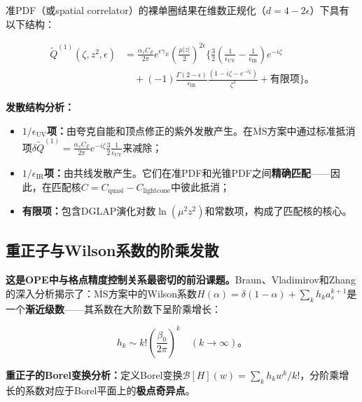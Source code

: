 \documentclass[12pt,a4paper]{ctexart}
\theoremstyle{definition}
\begin{document}
准PDF（或spatial correlator）的裸单圈结果在维数正规化（$d=4-2\epsilon$）下具有以下结构\cite{Izubuchi2018}：

\begin{equation}
\begin{aligned}
\tilde{Q}^{(1)}(\zeta, z^2, \epsilon) &= \frac{\alpha_s C_F}{2\pi} e^{\epsilon\gamma_E}\left(\frac{\mu|z|}{2}\right)^{2\epsilon} \Bigg\{ \frac{3}{2}\left(\frac{1}{\epsilon_{\text{UV}}} - \frac{1}{\epsilon_{\text{IR}}}\right) e^{-i\zeta} \\
&\quad + (-1)\frac{\Gamma(2-\epsilon)}{\epsilon_{\text{IR}}} \frac{(1-i\zeta-e^{-i\zeta})}{\zeta^2} + \text{有限项} \Bigg\}。
\end{aligned}
\label{eq:one_loop_bare}
\end{equation}

\textbf{发散结构分析：}
\begin{itemize}
    \item \textbf{$1/\epsilon_{\text{UV}}$项：}由夸克自能和顶点修正的紫外发散产生。在$\overline{\text{MS}}$方案中通过标准抵消项$\delta\tilde{Q}^{(1)} = \frac{\alpha_s C_F}{2\pi} e^{-i\zeta} \frac{3}{2}\frac{1}{\epsilon_{\text{UV}}}$来减除；
    \item \textbf{$1/\epsilon_{\text{IR}}$项：}由共线发散产生。它们在准PDF和光锥PDF之间\textbf{精确匹配}——因此，在匹配核$C = C_{\text{quasi}} - C_{\text{lightcone}}$中彼此抵消；
    \item \textbf{有限项：}包含DGLAP演化对数$\ln(\mu^2 z^2)$和常数项，构成了匹配核的核心。
\end{itemize}

\subsection{重正子与Wilson系数的阶乘发散}

\textbf{这是OPE中与格点精度控制关系最密切的前沿课题。}Braun、Vladimirov和Zhang\cite{Braun2019power}的深入分析揭示了：$\overline{\text{MS}}$方案中的Wilson系数$H(\alpha) = \delta(1-\alpha) + \sum_k h_k a_s^{k+1}$是一个\textbf{渐近级数}——其系数在大阶数下呈阶乘增长：

\begin{equation}
h_k \sim k! \left(\frac{\beta_0}{2\pi}\right)^k \quad (k \to \infty)。
\label{eq:factorial_growth}
\end{equation}

\textbf{重正子的Borel变换分析：}定义Borel变换$\mathcal{B}[H](w) = \sum_k h_k w^k/k!$，分阶乘增长的系数对应于Borel平面上的\textbf{极点奇异点}。
\end{document}
